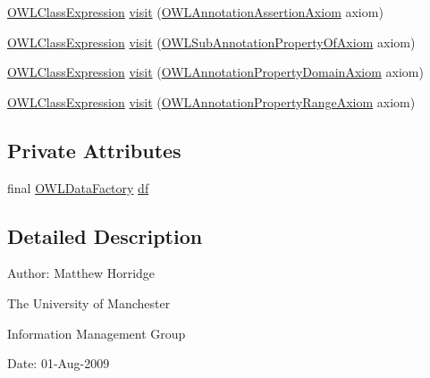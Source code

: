 \begin{DoxyCompactItemize}
\hyperlink{interfaceorg_1_1semanticweb_1_1owlapi_1_1model_1_1_o_w_l_class_expression}{O\-W\-L\-Class\-Expression} \hyperlink{classorg_1_1semanticweb_1_1owlapi_1_1reasoner_1_1impl_1_1_satisfiability_reducer_a5f2c1de0c21df9dc89119be6e2df766b}{visit} (\hyperlink{interfaceorg_1_1semanticweb_1_1owlapi_1_1model_1_1_o_w_l_annotation_assertion_axiom}{O\-W\-L\-Annotation\-Assertion\-Axiom} axiom)
\item 
\hyperlink{interfaceorg_1_1semanticweb_1_1owlapi_1_1model_1_1_o_w_l_class_expression}{O\-W\-L\-Class\-Expression} \hyperlink{classorg_1_1semanticweb_1_1owlapi_1_1reasoner_1_1impl_1_1_satisfiability_reducer_abb85333e88626d4353d896163f98189a}{visit} (\hyperlink{interfaceorg_1_1semanticweb_1_1owlapi_1_1model_1_1_o_w_l_sub_annotation_property_of_axiom}{O\-W\-L\-Sub\-Annotation\-Property\-Of\-Axiom} axiom)
\item 
\hyperlink{interfaceorg_1_1semanticweb_1_1owlapi_1_1model_1_1_o_w_l_class_expression}{O\-W\-L\-Class\-Expression} \hyperlink{classorg_1_1semanticweb_1_1owlapi_1_1reasoner_1_1impl_1_1_satisfiability_reducer_ae78d7d40d4462e9df38f3d73949091ff}{visit} (\hyperlink{interfaceorg_1_1semanticweb_1_1owlapi_1_1model_1_1_o_w_l_annotation_property_domain_axiom}{O\-W\-L\-Annotation\-Property\-Domain\-Axiom} axiom)
\item 
\hyperlink{interfaceorg_1_1semanticweb_1_1owlapi_1_1model_1_1_o_w_l_class_expression}{O\-W\-L\-Class\-Expression} \hyperlink{classorg_1_1semanticweb_1_1owlapi_1_1reasoner_1_1impl_1_1_satisfiability_reducer_aea4e76e7c03397f533c03ae13ad88e7b}{visit} (\hyperlink{interfaceorg_1_1semanticweb_1_1owlapi_1_1model_1_1_o_w_l_annotation_property_range_axiom}{O\-W\-L\-Annotation\-Property\-Range\-Axiom} axiom)
\end{DoxyCompactItemize}
\subsection*{Private Attributes}
\begin{DoxyCompactItemize}
\item 
final \hyperlink{interfaceorg_1_1semanticweb_1_1owlapi_1_1model_1_1_o_w_l_data_factory}{O\-W\-L\-Data\-Factory} \hyperlink{classorg_1_1semanticweb_1_1owlapi_1_1reasoner_1_1impl_1_1_satisfiability_reducer_a8cb32fcee7df9db69bad1a7a2b088e99}{df}
\end{DoxyCompactItemize}


\subsection{Detailed Description}
Author\-: Matthew Horridge\par
 The University of Manchester\par
 Information Management Group\par
 Date\-: 01-\/\-Aug-\/2009 

